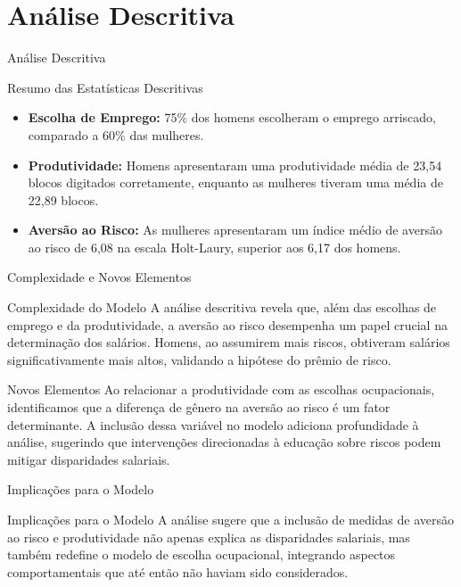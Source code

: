 \documentclass[aspectratio=169, xcolor={dvipsnames}, 10pt, brazil]{beamer}
\begin{document}
\section{Análise Descritiva}
\begin{frame}{Análise Descritiva}
    \begin{block}{Resumo das Estatísticas Descritivas}
        \begin{itemize}
            \item \textbf{Escolha de Emprego:} 75\% dos homens escolheram o emprego arriscado, comparado a 60\% das mulheres.
            \item \textbf{Produtividade:} Homens apresentaram uma produtividade média de 23,54 blocos digitados corretamente, enquanto as mulheres tiveram uma média de 22,89 blocos.
            \item \textbf{Aversão ao Risco:} As mulheres apresentaram um índice médio de aversão ao risco de 6,08 na escala Holt-Laury, superior aos 6,17 dos homens.
        \end{itemize}
    \end{block}
\end{frame}

\begin{frame}{Complexidade e Novos Elementos}
    \begin{block}{Complexidade do Modelo}
        A análise descritiva revela que, além das escolhas de emprego e da produtividade, a aversão ao risco desempenha um papel crucial na determinação dos salários. Homens, ao assumirem mais riscos, obtiveram salários significativamente mais altos, validando a hipótese do prêmio de risco.
    \end{block}
    
    \vspace{0.5cm}
    
    \begin{block}{Novos Elementos}
        Ao relacionar a produtividade com as escolhas ocupacionais, identificamos que a diferença de gênero na aversão ao risco é um fator determinante. A inclusão dessa variável no modelo adiciona profundidade à análise, sugerindo que intervenções direcionadas à educação sobre riscos podem mitigar disparidades salariais.
    \end{block}
\end{frame}

\begin{frame}{Implicações para o Modelo}
    \begin{block}{Implicações para o Modelo}
        A análise sugere que a inclusão de medidas de aversão ao risco e produtividade não apenas explica as disparidades salariais, mas também redefine o modelo de escolha ocupacional, integrando aspectos comportamentais que até então não haviam sido considerados.
    \end{block}
\end{frame}
\end{document}
